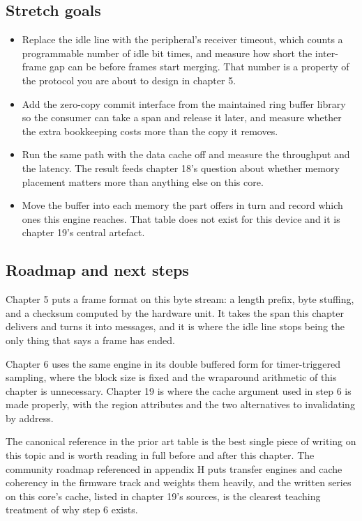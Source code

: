 \subsection*{Stretch goals}

\begin{itemize}
\item Replace the idle line with the peripheral's receiver timeout, which counts
a programmable number of idle bit times, and measure how short the inter-frame
gap can be before frames start merging. That number is a property of the
protocol you are about to design in chapter 5.
\item Add the zero-copy commit interface from the maintained ring buffer library
so the consumer can take a span and release it later, and measure whether the
extra bookkeeping costs more than the copy it removes.
\item Run the same path with the data cache off and measure the throughput and
the latency. The result feeds chapter 18's question about whether memory
placement matters more than anything else on this core.
\item Move the buffer into each memory the part offers in turn and record which
ones this engine reaches. That table does not exist for this device and it is
chapter 19's central artefact.
\end{itemize}

\subsection*{Roadmap and next steps}

Chapter 5 puts a frame format on this byte stream: a length prefix, byte
stuffing, and a checksum computed by the hardware unit. It takes the span this
chapter delivers and turns it into messages, and it is where the idle line stops
being the only thing that says a frame has ended.

Chapter 6 uses the same engine in its double buffered form for timer-triggered
sampling, where the block size is fixed and the wraparound arithmetic of this
chapter is unnecessary. Chapter 19 is where the cache argument used in step 6 is
made properly, with the region attributes and the two alternatives to
invalidating by address.

The canonical reference in the prior art table is the best single piece of
writing on this topic and is worth reading in full before and after this
chapter. The community roadmap referenced in appendix H puts transfer engines
and cache coherency in the firmware track and weights them heavily, and the
written series on this core's cache, listed in chapter 19's sources, is the
clearest teaching treatment of why step 6 exists.

